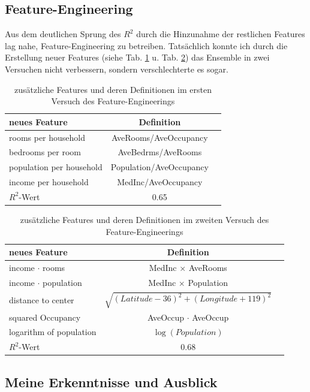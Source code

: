 \documentclass[9pt,a4paper,twocolumn,twoside]{tau-class/tau}
\begin{document}
\subsection{Feature-Engineering}
Aus dem deutlichen Sprung des $R^2$ durch die Hinzunahme der restlichen Features lag nahe, Feature-Engineering
zu betreiben. Tatsächlich konnte ich durch die Erstellung neuer Features (siehe Tab. \ref{tab:features_1} u. Tab. \ref{tab:features_20}) das Ensemble in zwei Versuchen nicht verbessern, sondern verschlechterte es sogar. 
\begin{table}[h]
\begin{tabular}{@{}lcc@{}}
\hline
neues Feature & Definition \\
\hline
rooms per household & AveRooms/AveOccupancy \\
bedrooms per room & AveBedrms/AveRooms \\
population per household & Population/AveOccupancy \\
income per household & MedInc/AveOccupancy \\
\hline
\hline
$R^2$-Wert & 0.65 \\
\hline
\end{tabular}
\caption{zusätzliche Features und deren Definitionen im ersten Versuch des Feature-Engineerings}
\label{tab:features_1}
\end{table}
\begin{table}[h]

\begin{tabular}{@{}lcc@{}}
    \hline
    neues Feature & Definition \\
\hline
income $\cdot$ rooms & MedInc $\times$ AveRooms \\
income $\cdot$ population & MedInc $\times$ Population \\
distance to center & $\sqrt{(Latitude - 36)^2 + (Longitude + 119)^2}$ \\
squared Occupancy & AveOccup $\cdot$ AveOccup \\
logarithm of population & $\log(Population)$ \\
\hline
\hline
$R^2$-Wert & 0.68 \\
\hline
\end{tabular}
\label{tab:features_20}
\caption{zusätzliche Features und deren Definitionen im zweiten Versuch des Feature-Engineerings}
\end{table}

\subsection{Meine Erkenntnisse und Ausblick}
\end{document}
